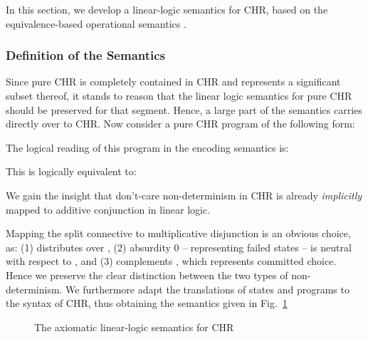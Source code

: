 \documentclass[acmtocl]{acmtrans2m}
\begin{document}
In this section, we develop a linear-logic semantics for CHR, based on
the equivalence-based operational semantics .

\subsubsection{Definition of the Semantics}

Since pure CHR is completely contained in CHR and represents a
significant subset thereof, it stands to reason that the linear logic semantics
for pure CHR should be preserved for that segment. Hence, a large part of the
semantics carries directly over to CHR. Now consider a pure CHR program
 of the following form:

The logical reading of this program in the encoding semantics is:

This is logically equivalent to:


We gain the insight that don't-care non-determinism in CHR is already
\emph{implicitly} mapped to additive conjunction  in linear logic.

Mapping the split connective  to multiplicative disjunction  is
an obvious choice, as: (1)  distributes over , (2)
absurdity 0 -- representing failed states -- is neutral with respect to
, and (3)  complements , which represents committed choice.
Hence we preserve the clear distinction between the two types of
non-determinism. We furthermore adapt the translations of states and programs to
the syntax of CHR, thus obtaining the semantics given in
Fig.~\ref{fig:chrv-axiomatic-semantics}

\begin{figure}
	\begin{center}
\end{center}
\caption{The axiomatic linear-logic semantics for CHR}
\label{fig:chrv-axiomatic-semantics}
\end{figure}
\end{document}
